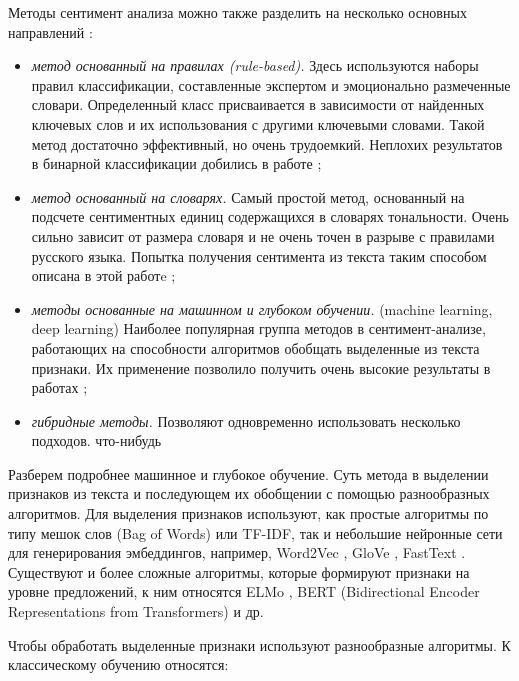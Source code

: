 \bigskip\par
Методы сентимент анализа можно также разделить на несколько основных направлений \cite{Semina}:
\bigskip
\begin{itemize}
 \item \textit{метод основанный на правилах (rule-based).} Здесь используются наборы правил классификации, составленные экспертом и эмоционально размеченные словари. Определенный класс присваивается в зависимости от найденных ключевых слов и их использования с другими ключевыми словами. Такой метод достаточно эффективный, но
 очень трудоемкий. Неплохих результатов в бинарной классификации добились в работе \cite{atex};

 \item \textit{метод основанный на словарях.} Самый простой метод, основанный  на подсчете сентиментных единиц содержащихся в словарях тональности. Очень сильно зависит от размера словаря и не очень точен в разрыве с правилами русского языка. Попытка получения сентимента из текста таким способом описана в этой работe \cite{Kirill};

 \item \textit{методы основанные на машинном и глубоком обучении.} (machine learning, deep learning) Наиболее популярная группа методов в сентимент-анализе, работающих на способности алгоритмов обобщать выделенные из текста признаки. Их применение позволило получить очень высокие результаты в работах \cite{senti1, senti2, senti3, senti4};

 \item \textit{гибридные методы.} Позволяют одновременно использовать несколько подходов. %
что-нибудь
\end{itemize}

\bigskip\par
Разберем подробнее машинное и глубокое обучение. Суть метода в выделении признаков из текста и последующем их
обобщении с помощью разнообразных алгоритмов. Для выделения признаков используют, как простые алгоритмы по
типу мешок слов (Bag of Words) или TF-IDF, так и небольшие нейронные сети для генерирования эмбеддингов,
например, Word2Vec \cite{Mikolov:1}, GloVe \cite{glove}, FastText \cite{fasttext}. Существуют и более сложные алгоритмы, которые формируют признаки на уровне предложений, к ним относятся ELMo \cite{elmo1,elmo2}, BERT (Bidirectional Encoder Representations from Transformers) \cite{bert} и др.

\bigskip\par
Чтобы обработать выделенные признаки используют разнообразные алгоритмы. К классическому обучению относятся:

